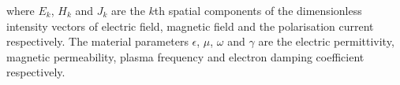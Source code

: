where $E_k$, $H_k$ and $J_k$ are the $k$th spatial components of the dimensionless intensity vectors of electric field, magnetic field and the polarisation current respectively. The material parameters $\epsilon$, $\mu$, $\omega$ and $\gamma$ are the electric permittivity, magnetic permeability, plasma frequency and electron damping coefficient respectively.

%





